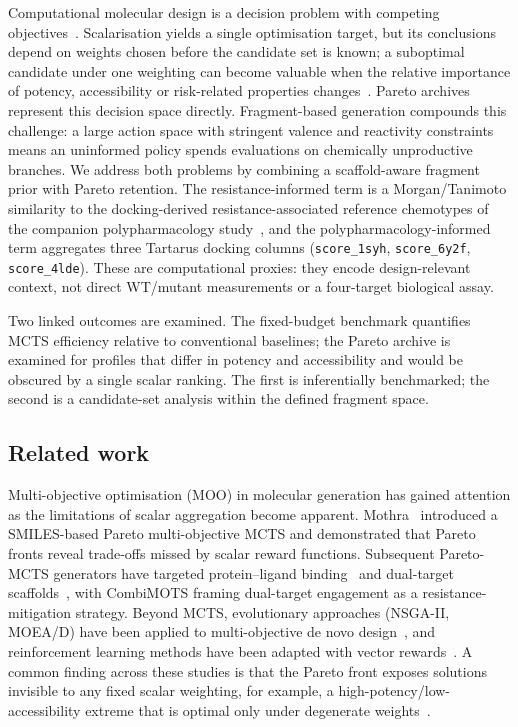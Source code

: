 \documentclass[10pt,a4paper]{article}
\begin{document}
Computational molecular design is a decision problem with competing objectives~\citep{GDPLarge2019,Olivecrona2017}. Scalarisation yields a single optimisation target, but its conclusions depend on weights chosen before the candidate set is known; a suboptimal candidate under one weighting can become valuable when the relative importance of potency, accessibility or risk-related properties changes~\citep{Mothra2024,Zitzler2003}. Pareto archives represent this decision space directly. Fragment-based generation compounds this challenge: a large action space with stringent valence and reactivity constraints means an uninformed policy spends evaluations on chemically unproductive branches. We address both problems by combining a scaffold-aware fragment prior with Pareto retention. The resistance-informed term is a Morgan/Tanimoto similarity to the docking-derived resistance-associated reference chemotypes of the companion polypharmacology study~\citep{Temgoua2026b}, and the polypharmacology-informed term aggregates three Tartarus docking columns (\texttt{score\_1syh}, \texttt{score\_6y2f}, \texttt{score\_4lde}). These are computational proxies: they encode design-relevant context, not direct WT/mutant measurements or a four-target biological assay.

Two linked outcomes are examined. The fixed-budget benchmark quantifies MCTS efficiency relative to conventional baselines; the Pareto archive is examined for profiles that differ in potency and accessibility and would be obscured by a single scalar ranking. The first is inferentially benchmarked; the second is a candidate-set analysis within the defined fragment space.

\subsection{Related work}

Multi-objective optimisation (MOO) in molecular generation has gained attention as the limitations of scalar aggregation become apparent. Mothra~\citep{Mothra2024} introduced a SMILES-based Pareto multi-objective MCTS and demonstrated that Pareto fronts reveal trade-offs missed by scalar reward functions. Subsequent Pareto-MCTS generators have targeted protein--ligand binding~\citep{ParetoDrug2024} and dual-target scaffolds~\citep{CombiMOTS2026}, with CombiMOTS framing dual-target engagement as a resistance-mitigation strategy. Beyond MCTS, evolutionary approaches (NSGA-II, MOEA/D) have been applied to multi-objective de novo design~\citep{Jensen2019}, and reinforcement learning methods have been adapted with vector rewards~\citep{Zhou2019}. A common finding across these studies is that the Pareto front exposes solutions invisible to any fixed scalar weighting, for example, a high-potency/low-accessibility extreme that is optimal only under degenerate weights~\citep{Zitzler2003}.
\end{document}
